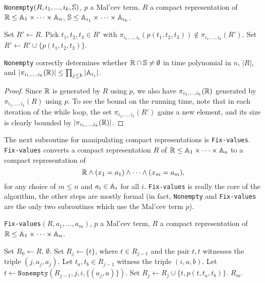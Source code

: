 \documentclass[letterpaper,11pt]{article}
\DeclareMathOperator{\Sig}{Sig}
\begin{document}
\begin{algorithm}
\caption{\texttt{Nonempty}$(R, i_1, ..., i_k, \mathbb{S})$, $p$ a Mal'cev term, $R$ a compact representation of $\mathbb{R} \le \mathbb{A}_1\times \cdots\times \mathbb{A}_n$, $\mathbb{S} \le \mathbb{A}_{i_1} \times \cdots \times \mathbb{A}_{i_k}$.}
\begin{algorithmic}[1]
\State Set $R' \gets R$.
\State Pick $t_1, t_2, t_3 \in R'$ with $\pi_{i_1, ..., i_k}(p(t_1,t_2,t_3)) \not\in \pi_{i_1, ..., i_k}(R')$.
\State Set $R' \gets R' \cup \{p(t_1,t_2,t_3)\}$.
\EndWhile
{}
\State {}
\Else
\State {}
\EndIf
\end{algorithmic}
\end{algorithm}

\begin{prop} \texttt{Nonempty} correctly determines whether $\mathbb{R} \cap \mathbb{S} \ne \emptyset$ in time polynomial in $n$, $|R|$, and $|\pi_{i_1, ..., i_k}(\mathbb{R})| \le \prod_{j \le k} |\mathbb{A}_{i_j}|$.
\end{prop}
\begin{proof} Since $\mathbb{R}$ is generated by $R$ using $p$, we also have $\pi_{i_1,...,i_k}(\mathbb{R})$ generated by $\pi_{i_1, ..., i_k}(R)$ using $p$. To see the bound on the running time, note that in each iteration of the while loop, the set $\pi_{i_1, ..., i_k}(R')$ gains a new element, and its size is clearly bounded by $|\pi_{i_1, ..., i_k}(\mathbb{R})|$.
\end{proof}

The next subroutine for manipulating compact representations is \texttt{Fix-values}. \texttt{Fix-values} converts a compact representation $R$ of $\mathbb{R} \le \mathbb{A}_1\times \cdots\times \mathbb{A}_n$ to a compact representation of
\[
\mathbb{R} \wedge (x_1 = a_1) \wedge \cdots \wedge (x_m = a_m),
\]
for any choice of $m \le n$ and $a_i \in \mathbb{A}_i$ for all $i$. \texttt{Fix-values} is really the core of the algorithm, the other steps are mostly formal (in fact, \texttt{Nonempty} and \texttt{Fix-values} are the only two subroutines which use the Mal'cev term $p$).

\begin{algorithm}
\caption{\texttt{Fix-values}$(R, a_1, ..., a_m)$, $p$ a Mal'cev term, $R$ a compact representation of $\mathbb{R} \le \mathbb{A}_1\times \cdots\times \mathbb{A}_n$.}
\begin{algorithmic}[1]
\State Set $R_0 \gets R$.
\If{$(j,a_j,a_j) \not\in \Sig(R_{j-1})$}
\State \Return $\emptyset$.
\Else
\State Set $R_{j} \gets \{t\}$, where $t \in R_{j-1}$ and the pair $t,t$ witnesses the triple $(j,a_j,a_j)$.
\EndIf
\ForAll{$(i,a,b) \in \Sig(R_{j-1})$ with $i > j$}%
\State Let $t_a,t_b \in R_{j-1}$ witness the triple $(i,a,b)$.%
\State Let $t \gets \texttt{Nonempty}(R_{j-1},j,i,\{(a_{j},a)\})$.
\State Set $R_{j} \gets R_{j} \cup \{t, p(t,t_a,t_b)\}$.
\EndIf
\EndFor
\EndFor
\State \Return $R_m$.
\end{algorithmic}
\end{algorithm}
\end{document}
